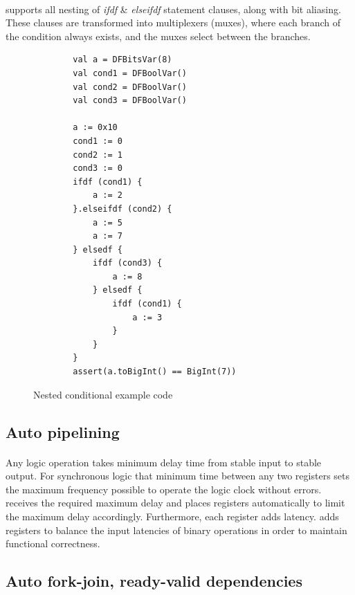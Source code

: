\paragraph{}\cf supports all nesting of \textit{ifdf} \& \textit{elseifdf} statement clauses, along with bit aliasing. These clauses are transformed into multiplexers (muxes), where each branch of the condition always exists, and the muxes select between the branches.
\begin{figure}[h]
	\centering
	\begin{verbatim}
		val a = DFBitsVar(8)
		val cond1 = DFBoolVar()
		val cond2 = DFBoolVar()
		val cond3 = DFBoolVar()
		
		a := 0x10
		cond1 := 0
		cond2 := 1
		cond3 := 0
		ifdf (cond1) {
			a := 2
		}.elseifdf (cond2) {
			a := 5
			a := 7
		} elsedf {
			ifdf (cond3) {
				a := 8
			} elsedf {
				ifdf (cond1) {
					a := 3
				}
			}
		}
		assert(a.toBigInt() == BigInt(7))
	\end{verbatim}
	\caption{Nested conditional example code}\label{fig:Nested conditional example code}
\end{figure}


\subsection{Auto pipelining}
\label{subsec:auto_pipelining}
\paragraph{}Any logic operation takes minimum delay time from stable input to stable output. For synchronous logic that minimum time between any two registers sets the maximum frequency possible to operate the logic clock without errors. \cf receives the required maximum delay and places registers automatically to limit the maximum delay accordingly. Furthermore, each register adds latency. \cf adds registers to balance the input latencies of binary operations in order to maintain functional correctness. 


\subsection{Auto fork-join, ready-valid dependencies}
\label{subsec:auto_fork-join}
